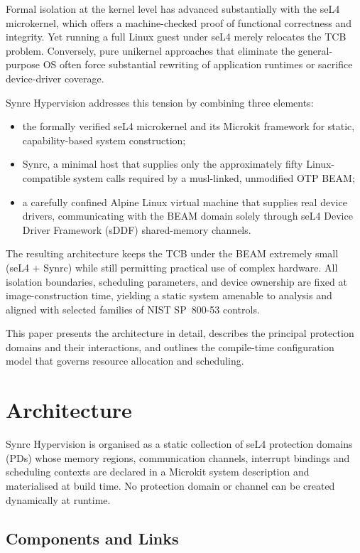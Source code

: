 \documentclass{article}
\begin{document}
Formal isolation at the kernel level has advanced substantially with the seL4 microkernel,
which offers a machine-checked proof of functional correctness and integrity. Yet running
a full Linux guest under seL4 merely relocates the TCB problem. Conversely, pure unikernel
approaches that eliminate the general-purpose OS often force substantial rewriting of
application runtimes or sacrifice device-driver coverage.

Synrc Hypervision addresses this tension by combining three elements:

\begin{itemize}
  \item the formally verified seL4 microkernel and its Microkit framework for static, capability-based system construction;
  \item Synrc, a minimal host that supplies only the approximately fifty Linux-compatible system calls required by a musl-linked, unmodified OTP BEAM;
  \item a carefully confined Alpine Linux virtual machine that supplies real device drivers, communicating with the BEAM domain solely through seL4 Device Driver Framework (sDDF) shared-memory channels.
\end{itemize}

The resulting architecture keeps the TCB under the BEAM extremely small (seL4 + Synrc) while still permitting practical use of complex hardware. All isolation boundaries, scheduling parameters, and device ownership are fixed at image-construction time, yielding a static system amenable to analysis and aligned with selected families of NIST SP~800-53 controls.

This paper presents the architecture in detail, describes the principal protection domains and their interactions, and outlines the compile-time configuration model that governs resource allocation and scheduling.

\newpage
\section{Architecture}
\label{sec:architecture}

Synrc Hypervision is organised as a static collection of seL4 protection domains (PDs) whose memory regions, communication channels, interrupt bindings and scheduling contexts are declared in a Microkit system description and materialised at build time. No protection domain or channel can be created dynamically at runtime.

\subsection{Components and Links}
\label{sec:components}
\end{document}
